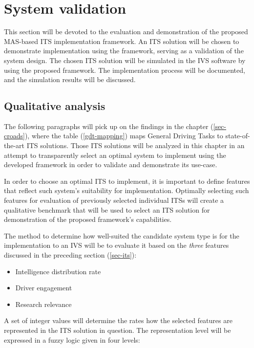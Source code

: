 \documentclass[main.tex]{subfiles}
\begin{document}
\section{System validation}

This section will be devoted to the evaluation and demonstration of the proposed MAS-based ITS
implementation framework. An ITS solution will be chosen to demonstrate implementation using 
the framework, serving as a validation of the system design. The chosen ITS solution will be simulated
in the IVS software by using the proposed framework. The implementation process will be documented, 
and the simulation results will be discussed.

\subsection{Qualitative analysis}

The following paragraphs will pick up on the findings in the chapter (\ref{sec-croads}), where the
table (\ref{gdt-mapping}) maps General Driving Tasks to state-of-the-art ITS solutions. Those
ITS solutions will be analyzed in this chapter in an attempt to transparently select an optimal
system to implement using the developed framework in order to validate and demonstrate its
use-case. 

In order to choose an optimal ITS to implement, it is important to define features that 
reflect such system's suitability for implementation. Optimally selecting such features 
for evaluation of previously selected individual ITSs will create a qualitative benchmark that
will be used to select an ITS solution for demonstration of the proposed framework's
capabilities.

The method to determine how well-suited the candidate system type is for the implementation to
an IVS will be to evaluate it based on the \emph{three} features discussed in the preceding
section (\ref{sec-its}): 

\begin{itemize}
    \item Intelligence distribution rate
    \item Driver engagement
    \item Research relevance
\end{itemize}

A set of integer values will determine the rates how the selected features are represented in the 
ITS solution in question. The representation level will be expressed in a fuzzy logic given in four levels:
\end{document}
